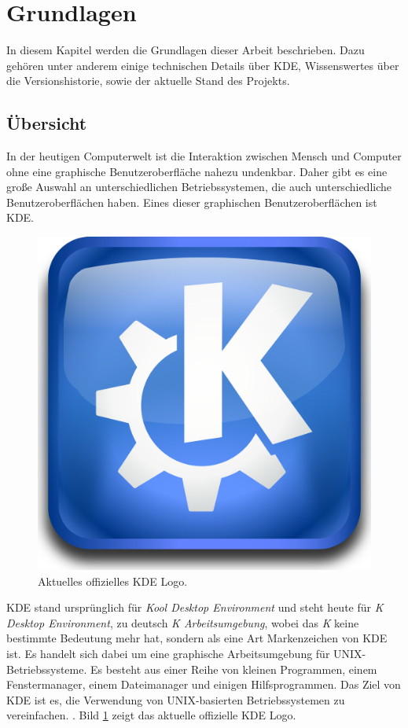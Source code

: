 \section{Grundlagen}

In diesem Kapitel werden die Grundlagen dieser Arbeit beschrieben. Dazu gehören unter anderem einige technischen Details über KDE, Wissenswertes über die Versionshistorie, sowie der aktuelle Stand des Projekts.

\subsection{Übersicht}
In der heutigen Computerwelt ist die Interaktion zwischen Mensch und Computer ohne eine graphische Benutzeroberfläche nahezu undenkbar. Daher gibt es eine große Auswahl an unterschiedlichen Betriebssystemen, die auch unterschiedliche Benutzeroberflächen haben. Eines dieser graphischen Benutzeroberflächen ist KDE.

\begin{figure}[h]
	\centering
	\includegraphics[width=0.7\linewidth]{images/KDE_logo.png}
	\caption{Aktuelles offizielles KDE Logo. \cite{kdelogo}}
	\label{fig:kdelogo}
\end{figure}

KDE stand ursprünglich für \textit{Kool Desktop Environment} und steht heute für \textit{K Desktop Environment}, zu deutsch \textit{K Arbeitsumgebung}, wobei das \textit{K} keine bestimmte Bedeutung mehr hat, sondern als eine Art Markenzeichen von KDE ist. Es handelt sich dabei um eine graphische Arbeitsumgebung für UNIX-Betriebssysteme. Es besteht aus einer Reihe von kleinen Programmen, einem Fenstermanager, einem Dateimanager und einigen Hilfsprogrammen. Das Ziel von KDE ist es, die Verwendung von UNIX-basierten Betriebssystemen zu vereinfachen. \cite{TUChemnitzKDE}. Bild \ref{fig:kdelogo} zeigt das aktuelle offizielle KDE Logo.

